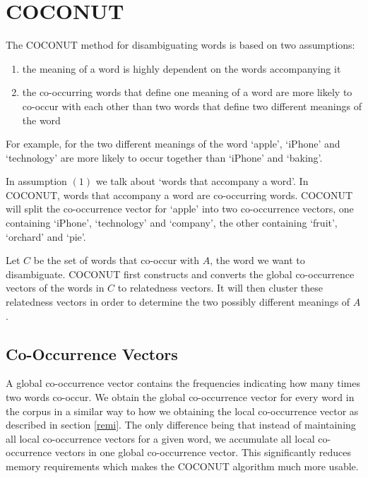 \documentclass[11pt]{article}
\begin{document}
\section{COCONUT}
\label{anouk}
The COCONUT method for disambiguating words is based on two assumptions: 
\begin{enumerate}
\item the meaning of a word is highly dependent on the words accompanying it
\item the co-occurring words that define one meaning of a word are more likely to co-occur with each other than two words that define two different meanings of the word
\end{enumerate}
For example, for the two different meanings of the word `apple', `iPhone' and `technology' are more likely to occur together than `iPhone' and `baking'. 

In assumption $(1)$ we talk about `words that accompany a word'. In COCONUT, words that accompany a word are co-occurring words. COCONUT will split the co-occurrence vector for `apple' into two co-occurrence vectors, one containing `iPhone', `technology' and `company', the other containing `fruit', `orchard' and `pie'. 

Let $C$ be the set of words that co-occur with $A$, the word we want to disambiguate. COCONUT first constructs and converts the global co-occurrence vectors of the words in $C$ to relatedness vectors. It will then cluster these relatedness vectors in order to determine the two possibly different meanings of $A$. 

\subsection{Co-Occurrence Vectors}
A global co-occurrence vector contains the frequencies indicating how many times two words co-occur. We obtain the global co-occurrence vector for every word in the corpus in a similar way to how we obtaining the local co-occurrence vector as described in section \ref{remi}. The only difference being that instead of maintaining all local co-occurrence vectors for a given word, we accumulate all local co-occurrence vectors in one global co-occurrence vector. This significantly reduces memory requirements which makes the COCONUT algorithm much more usable. 
\end{document}
